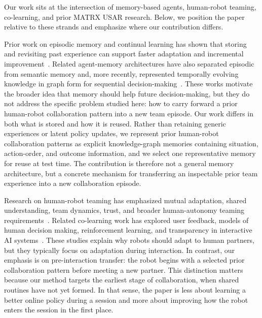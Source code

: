 \documentclass[letterpaper, 10 pt, conference]{ieeeconf}  %
\begin{document}
Our work sits at the intersection of memory-based agents, human-robot teaming,
co-learning, and prior MATRX USAR research. Below, we position the paper relative to
these strands and emphasize where our contribution differs.

Prior work on episodic memory and continual learning has shown that storing and revisiting
past experience can support faster adaptation and incremental improvement~\cite{pmlr-v70-pritzel17a,chaudhry2019efficientlifelonglearningagem}.
Related agent-memory architectures have also separated episodic from semantic memory and,
more recently, represented temporally evolving knowledge in graph form for sequential
decision-making~\cite{https://doi.org/10.48550/arxiv.2204.01611,Kim_Cochez_Francois-Lavet_Neerincx_Vossen_2023,kim2026temporalknowledgegraphmemorypartially}.
These works motivate the broader idea that memory should help future decision-making,
but they do not address the specific problem studied here: how to carry forward a prior
human-robot collaboration pattern into a new team episode. Our work differs in both
what is stored and how it is reused. Rather than retaining generic experiences or latent
policy updates, we represent prior human-robot collaboration patterns as explicit
knowledge-graph memories containing situation, action-order, and outcome information,
and we select one representative memory for reuse at test time. The contribution is
therefore not a general memory architecture, but a concrete mechanism for transferring
an inspectable prior team experience into a new collaboration episode.

Research on human-robot teaming has emphasized mutual adaptation, shared understanding,
team dynamics, trust, and broader human-autonomy teaming requirements~\cite{Nikolaidis,Haripriyan2024TeamDynamics,ChaconQuesada2024SharedMentalModels,Smith2024HumanAutonomyTeaming}.
Related co-learning work has explored user feedback, models of human decision making,
reinforcement learning, and transparency in interactive AI systems~\cite{Kumar2024CoLearning,DBLP:journals/corr/abs-2003-01156,WenskovitchInteractiveAD}.
These studies explain why robots should adapt to human partners, but they typically
focus on adaptation during interaction. In contrast, our emphasis is on pre-interaction
transfer: the robot begins with a selected prior collaboration pattern before meeting a
new partner. This distinction matters because our method targets the earliest stage of
collaboration, when shared routines have not yet formed. In that sense, the paper is
less about learning a better online policy during a session and more about improving
how the robot enters the session in the first place.
\end{document}
